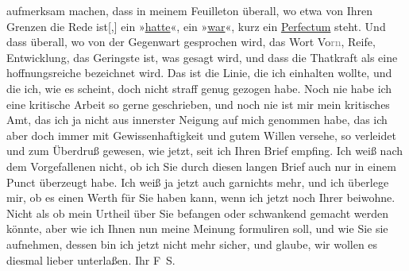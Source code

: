 \begin{ledgroupsized}[t]{13cm}
               aufmerksam machen, dass in meinem Feuilleton überall, wo etwa von Ihren Grenzen die Rede
                  ist{[},{]} ein »\uline{hatte}«, ein »\uline{war}«, kurz ein \uline{Perfectum} steht. Und dass überall, wo von der Gegenwart gesprochen wird, das
               Wort Vo\textcolor{gray}{rn}, Reife, Entwicklung, das Geringste ist, was gesagt wird,
               und dass die Thatkraft als eine hoffnungsreiche bezeichnet wird. Das ist die Linie,
               die ich einhalten wollte, und die ich, wie es scheint, doch nicht straff genug
               gezogen habe.\pend
           \pstart
           Noch nie habe ich eine kritische Arbeit so gerne geschrieben, und noch nie ist mir
               mein kritisches Amt, das ich ja nicht aus innerster Neigung auf mich genommen habe,
               das ich aber doch immer mit Gewissenhaftigkeit und gutem Willen versehe, so verleidet
               und zum Überdruß gewesen, wie jetzt, seit ich Ihren Brief empfing.\pend
           \pstart
           Ich weiß nach dem Vorgefallenen nicht, ob ich Sie durch diesen langen Brief auch nur
               in einem Punct überzeugt habe. Ich weiß ja jetzt auch garnichts mehr, und ich
               überlege mir, ob es einen Werth für Sie haben kann, wenn ich jetzt noch Ihrer \label{K_L03353-10v}\label{K_L03353-10h} beiwohne. Nicht als ob mein Urtheil über Sie befangen oder schwankend gemacht
               werden könnte, aber wie ich Ihnen nun meine Meinung formuliren soll, und wie Sie sie
               aufnehmen, dessen bin ich jetzt nicht mehr sicher, und glaube, wir wollen es diesmal
               lieber unterlaßen.\pend
           \pstart Ihr \spacefill\mbox{F S.}\pend{}
         
         \endnumbering{}\end{ledgroupsized}  \newcommand{\dateiname}{L03353}\newcommand{\titel}{Felix Salten an Arthur Schnitzler, [9. 11. 1903]}\newcommand{\editorInnen}{Martin Anton Müller und Laura Untner}
      
